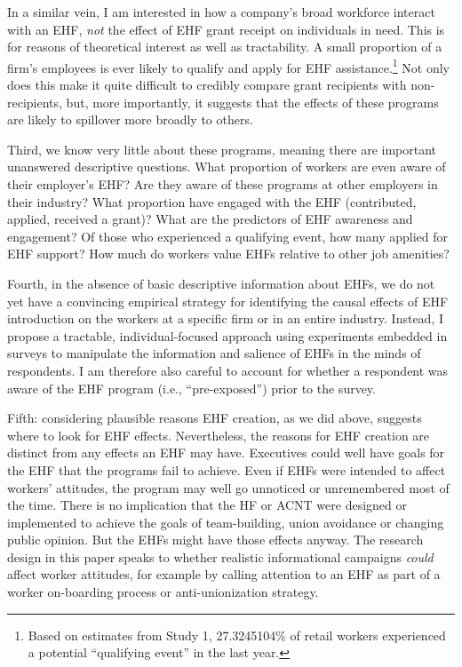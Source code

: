 \documentclass[
  11pt,
  oneside]{article}
\begin{document}
In a similar vein, I am interested in how a company's broad workforce interact with an EHF, \emph{not} the effect of EHF grant receipt on individuals in need. This is for reasons of theoretical interest as well as tractability. A small proportion of a firm's employees is ever likely to qualify and apply for EHF assistance.\footnote{Based on estimates from Study 1, 27.3245104\% of retail workers experienced a potential ``qualifying event'' in the last year.} Not only does this make it quite difficult to credibly compare grant recipients with non-recipients, but, more importantly, it suggests that the effects of these programs are likely to spillover more broadly to others.

Third, we know very little about these programs, meaning there are important unanswered descriptive questions. What proportion of workers are even aware of their employer's EHF? Are they aware of these programs at other employers in their industry? What proportion have engaged with the EHF (contributed, applied, received a grant)? What are the predictors of EHF awareness and engagement? Of those who experienced a qualifying event, how many applied for EHF support? How much do workers value EHFs relative to other job amenities?

Fourth, in the absence of basic descriptive information about EHFs, we do not yet have a convincing empirical strategy for identifying the causal effects of EHF introduction on the workers at a specific firm or in an entire industry. Instead, I propose a tractable, individual-focused approach using experiments embedded in surveys to manipulate the information and salience of EHFs in the minds of respondents. I am therefore also careful to account for whether a respondent was aware of the EHF program (i.e., ``pre-exposed'') prior to the survey.

Fifth: considering plausible reasons EHF creation, as we did above, suggests where to look for EHF effects. Nevertheless, the reasons for EHF creation are distinct from any effects an EHF may have. Executives could well have goals for the EHF that the programs fail to achieve. Even if EHFs were intended to affect workers' attitudes, the program may well go unnoticed or unremembered most of the time. There is no implication that the HF or ACNT were designed or implemented to achieve the goals of team-building, union avoidance or changing public opinion. But the EHFs might have those effects anyway. The research design in this paper speaks to whether realistic informational campaigns \emph{could} affect worker attitudes, for example by calling attention to an EHF as part of a worker on-boarding process or anti-unionization strategy.
\end{document}
